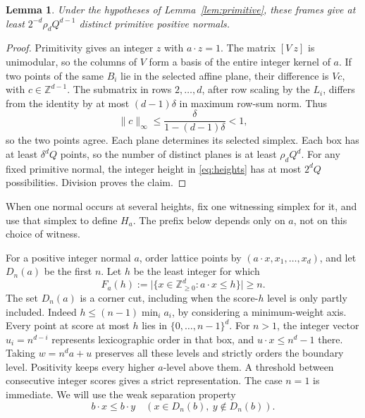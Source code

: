 \documentclass[11pt,a4paper]{article}
\newtheorem{lemma}[theorem]{Lemma}
\theoremstyle{remark}
\newcommand{\Z}{\mathbb Z}
\newcommand{\Nzero}{\Z_{\geq0}}
\newcommand{\card}[1]{\lvert#1\rvert}
\newcommand{\norm}[1]{\lVert#1\rVert_\infty}
\newcommand{\dd}{\delta}
\begin{document}
\begin{lemma}\label{lem:normals}
Under the hypotheses of Lemma~\ref{lem:primitive}, these frames give
at least \(2^{-d}\rho_dQ^{d-1}\) distinct primitive positive normals.
\end{lemma}
\begin{proof}
Primitivity gives an integer \(z\) with \(a\cdot z=1\).
The matrix \([V\ z]\) is unimodular, so the columns of \(V\) form a
basis of the entire integer kernel of \(a\).
If two points of the same \(B_i\) lie in the selected affine plane,
their difference is \(Vc\), with \(c\in\Z^{d-1}\).
The submatrix in rows \(2,\ldots,d\), after row scaling by the \(L_i\),
differs from the identity by at most \((d-1)\dd\) in maximum row-sum
norm. Thus
\[
 \norm{c}\leq\frac{\dd}{1-(d-1)\dd}<1,
\]
so the two points agree. Each plane determines its selected simplex.
Each box has at least \(\dd^dQ\) points, so the number of distinct
planes is at least \(\rho_dQ^d\).
For any fixed primitive normal, the integer height in
\eqref{eq:heights} has at most \(2^dQ\) possibilities. Division proves
the claim.
\end{proof}

When one normal occurs at several heights, fix one witnessing simplex
for it, and use that simplex to define \(H_a\).
The prefix below depends only on \(a\), not on this choice of witness.

For a positive integer normal \(a\), order lattice points by
\((a\cdot x,x_1,\ldots,x_d)\), and let \(D_n(a)\) be the first \(n\).
Let \(h\) be the least integer for which
\[
 F_a(h):=\card{\{x\in\Nzero^d:a\cdot x\leq h\}}\geq n.
\]
The set \(D_n(a)\) is a corner cut, including when the score-\(h\)
level is only partly included. Indeed
\(h\leq(n-1)\min_i a_i\), by considering a minimum-weight axis.
Every point at score at most \(h\) lies in \(\{0,\ldots,n-1\}^d\).
For \(n>1\), the integer vector \(u_i=n^{d-i}\) represents lexicographic
order in that box, and \(u\cdot x\leq n^d-1\) there.
Taking \(w=n^d a+u\) preserves all these levels and
strictly orders the boundary level. Positivity keeps every higher
\(a\)-level above them. A threshold between consecutive integer scores
gives a strict representation. The case \(n=1\) is immediate.
We will use the weak separation property
\[
 b\cdot x\leq b\cdot y
 \quad(x\in D_n(b),\ y\notin D_n(b)).
 \tag{9}\label{eq:weak}
\]
\end{document}
